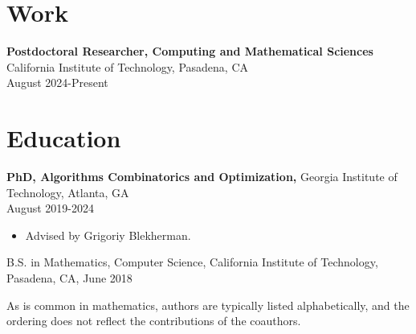 \documentclass[margin]{res}
\begin{document}
 
 

\begin{resume} 

\section{Work}
 {\bf Postdoctoral Researcher, Computing and Mathematical Sciences} California Institute of Technology, Pasadena, CA\\ August 2024-Present

\section{Education} 
 {\bf PhD, Algorithms Combinatorics and Optimization,} Georgia Institute of Technology, Atlanta, GA\\ August 2019-2024
 \begin{itemize} \itemsep -2pt  %
 \item Advised by Grigoriy Blekherman.
 \end{itemize}

B.S. in Mathematics, Computer Science, California Institute of Technology, Pasadena, CA, June 2018

{As is common in mathematics, authors are typically listed alphabetically, and the ordering does not reflect the contributions of the coauthors.}

\end{resume}
\end{document}
